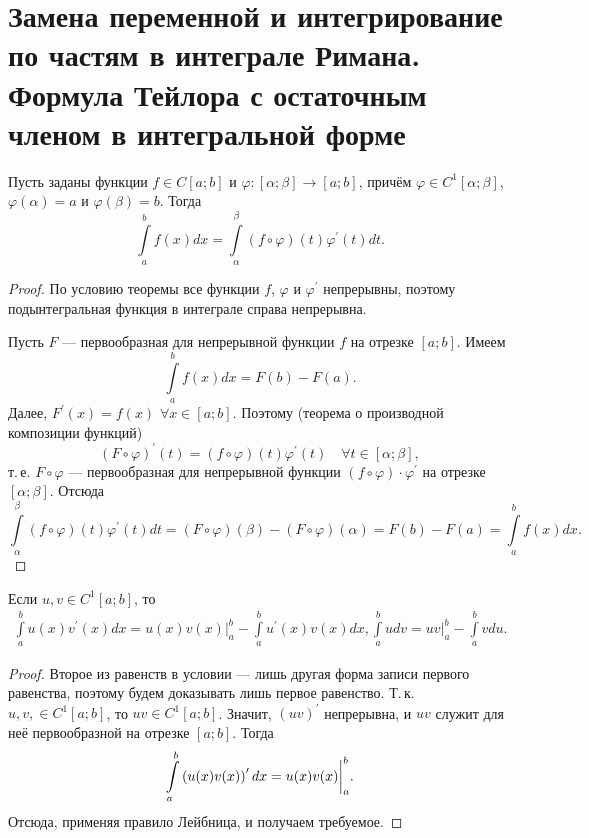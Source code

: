 \section{Замена переменной и интегрирование по частям в интеграле Римана. Формула Тейлора с остаточным членом в интегральной форме}

\begin{theorem}
    Пусть заданы функции $f \in C[a; b]$ и $\varphi: [\alpha; \beta] \to [a; b]$, причём $\varphi \in C^1[\alpha; \beta]$, $\varphi(\alpha) = a$ и $\varphi(\beta) = b$. Тогда
    \[
        \int\limits_a^bf(x)dx = \int\limits_\alpha^\beta(f \circ \varphi)(t)\varphi^\prime(t)dt.
    \]
\end{theorem}

\begin{proof}
    По условию теоремы все функции $f$, $\varphi$ и $\varphi^\prime$ непрерывны, поэтому подынтегральная функция в интеграле справа непрерывна.

    Пусть $F$ --- первообразная для непрерывной функции $f$ на отрезке $[a; b]$. Имеем
    \[
        \int\limits_a^bf(x)dx = F(b) - F(a).
    \]
    Далее, $F^\prime(x) = f(x)$ $\forall x \in [a; b]$. Поэтому (теорема о производной композиции функций)
    \[
        (F \circ \varphi)^\prime(t) = (f \circ \varphi)(t)\varphi^\prime(t)\quad\forall t \in [\alpha; \beta],
    \]
    т.\,е. $F \circ \varphi$ --- первообразная для непрерывной функции $(f \circ \varphi) \cdot \varphi^\prime$ на отрезке $[\alpha; \beta]$. Отсюда
    \[
        \int\limits_\alpha^\beta(f \circ \varphi)(t)\varphi^\prime(t)dt = (F \circ \varphi)(\beta) - (F \circ \varphi)(\alpha) = F(b) - F(a) = \int\limits_a^bf(x)dx.
    \]
\end{proof}

\begin{theorem}
    Если $u, v \in C^1[a; b]$, то
    \begin{gather*}
        \int\limits_a^bu(x)v^\prime(x)dx = u(x)v(x)\bigg|_a^b - \int\limits_a^bu^\prime(x)v(x)dx,
        \int\limits_a^budv = uv\bigg|_a^b - \int\limits_a^bvdu.
    \end{gather*}
\end{theorem}

\begin{proof}
    Второе из равенств в условии --- лишь другая форма записи первого равенства, поэтому будем доказывать лишь первое равенство. Т.\,к. $u, v, \in C^1[a; b]$, то $uv \in C^1[a; b]$. Значит, $(uv)^\prime$ непрерывна, и $uv$ служит для неё первообразной на отрезке $[a; b]$. Тогда
    \[
        \int\limits_a^b\left(u(x)v(x)\right)^\prime dx = u(x)v(x)\bigg|_a^b.
    \]
    Отсюда, применяя правило Лейбница, и получаем требуемое.
\end{proof}

